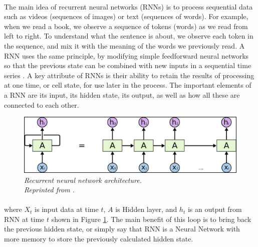 \paragraph{}
The main idea of recurrent neural networks (RNNs) is to process sequential data such as videos (sequences of images) or text (sequences of words). For example, when we read a book, we observe a sequence of tokens (words) as we read from left to right. To understand what the sentence is about, we observe each token in the sequence, and mix it with the meaning of the words we previously read. A RNN uses the same principle, by modifying simple feedforward neural networks so that the previous state can be combined with new inputs in a sequential time series \cite{donges_2019}. A key attribute of RNNs is their ability to retain the results of processing at one time, or cell state, for use later in the process. The important elements of a RNN are its input, its hidden state, its output, as well as how all these are connected to each other.


\begin{figure}[H]
  \centering
   \caption[Recurrent neural network architecture.]{\emph{Recurrent neural network architecture. \\ 
   Reprinted from \citeauthor{olah_2015} \citeyear{olah_2015}.}}\label{fig:RNN}
  \includegraphics[scale = 0.2]{figures/RNN.jpg}  
\end{figure}

\paragraph{}
where $X_t$ is input data at time $t$, $A$ is Hidden layer, and $h_t$ is an output from RNN at time $t$ shown in Figure \ref{fig:RNN}. The main benefit of this loop is to bring back the previous hidden state, or simply say that RNN is a Neural Network with more memory to store the previously calculated hidden state. 

